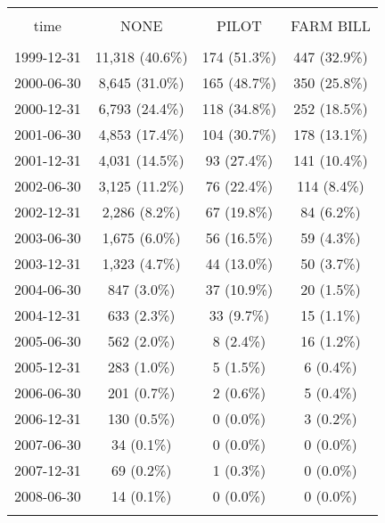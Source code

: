 
\begin{table}[!htbp] \centering 
  \caption{} 
  \label{} 
\begin{tabular}{@{\extracolsep{5pt}} cccc} 
\\[-1.8ex]\hline 
\hline \\[-1.8ex] 
time & NONE & PILOT & FARM BILL \\ 
\hline \\[-1.8ex] 
1999-12-31 & 11,318 (40.6\%) & 174 (51.3\%) & 447 (32.9\%) \\ 
2000-06-30 & 8,645 (31.0\%) & 165 (48.7\%) & 350 (25.8\%) \\ 
2000-12-31 & 6,793 (24.4\%) & 118 (34.8\%) & 252 (18.5\%) \\ 
2001-06-30 & 4,853 (17.4\%) & 104 (30.7\%) & 178 (13.1\%) \\ 
2001-12-31 & 4,031 (14.5\%) & 93 (27.4\%) & 141 (10.4\%) \\ 
2002-06-30 & 3,125 (11.2\%) & 76 (22.4\%) & 114 (8.4\%) \\ 
2002-12-31 & 2,286 (8.2\%) & 67 (19.8\%) & 84 (6.2\%) \\ 
2003-06-30 & 1,675 (6.0\%) & 56 (16.5\%) & 59 (4.3\%) \\ 
2003-12-31 & 1,323 (4.7\%) & 44 (13.0\%) & 50 (3.7\%) \\ 
2004-06-30 & 847 (3.0\%) & 37 (10.9\%) & 20 (1.5\%) \\ 
2004-12-31 & 633 (2.3\%) & 33 (9.7\%) & 15 (1.1\%) \\ 
2005-06-30 & 562 (2.0\%) & 8 (2.4\%) & 16 (1.2\%) \\ 
2005-12-31 & 283 (1.0\%) & 5 (1.5\%) & 6 (0.4\%) \\ 
2006-06-30 & 201 (0.7\%) & 2 (0.6\%) & 5 (0.4\%) \\ 
2006-12-31 & 130 (0.5\%) & 0 (0.0\%) & 3 (0.2\%) \\ 
2007-06-30 & 34 (0.1\%) & 0 (0.0\%) & 0 (0.0\%) \\ 
2007-12-31 & 69 (0.2\%) & 1 (0.3\%) & 0 (0.0\%) \\ 
2008-06-30 & 14 (0.1\%) & 0 (0.0\%) & 0 (0.0\%) \\ 
\hline \\[-1.8ex] 
\end{tabular} 
\end{table} 
